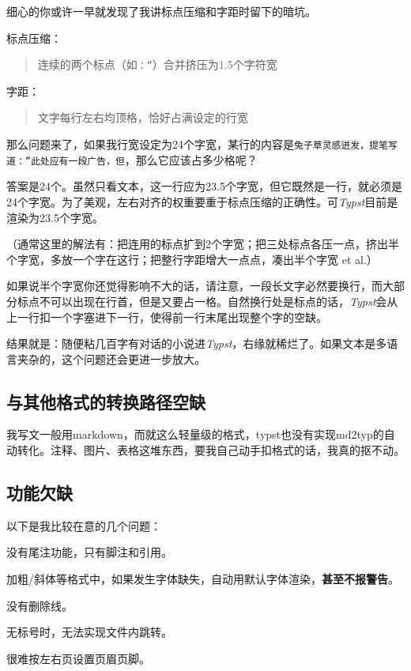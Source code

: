 \documentclass[10pt,openany]{book}
\begin{document}
\begin{sloppypar}
细心的你或许一早就发现了我讲标点压缩和字距时留下的暗坑。

标点压缩：

\begin{quotation} 连续的两个标点（如\texttt{：“}）合并挤压为1.5个字符宽 \end{quotation}

字距：

\begin{quotation} 文字每行左右均顶格，恰好占满设定的行宽 \end{quotation}

那么问题来了，如果我行宽设定为24个字宽，某行的内容是\texttt{兔子草灵感迸发，提笔写道：“此处应有一段广告，但}，那么它应该占多少格呢？

答案是24个。虽然只看文本，这一行应为23.5个字宽，但它既然是一行，就必须是24个字宽。为了美观，左右对齐的权重要重于标点压缩的正确性。可\textit{Typst}目前是渲染为23.5个字宽。

（通常这里的解法有：把连用的标点扩到2个字宽；把三处标点各压一点，挤出半个字宽，多放一个字在这行；把整行字距增大一点点，凑出半个字宽 et al.）

如果说半个字宽你还觉得影响不大的话，请注意，一段长文字必然要换行，而大部分标点不可以出现在行首，但是又要占一格。自然换行处是标点的话，\textit{Typst}会从上一行扣一个字塞进下一行，使得前一行末尾出现整个字的空缺。

结果就是：随便粘几百字有对话的小说进\textit{Typst}，右缘就稀烂了。如果文本是多语言夹杂的，这个问题还会更进一步放大。

\subsection{与其他格式的转换路径空缺}

我写文一般用markdown，而就这么轻量级的格式，typst也没有实现md2typ的自动转化。注释、图片、表格这堆东西，要我自己动手扣格式的话，我真的抠不动。

\subsection{功能欠缺}

以下是我比较在意的几个问题：

\begin{tightenum}
    \item   没有尾注功能，只有脚注和引用。
    \item   加粗/斜体等格式中，如果发生字体缺失，自动用默认字体渲染，\textbf{甚至不报警告}。
    \item   没有删除线。
    \item   无标号时，无法实现文件内跳转。
    \item   很难按左右页设置页眉页脚。
\end{tightenum}


\end{sloppypar}
\end{document}
